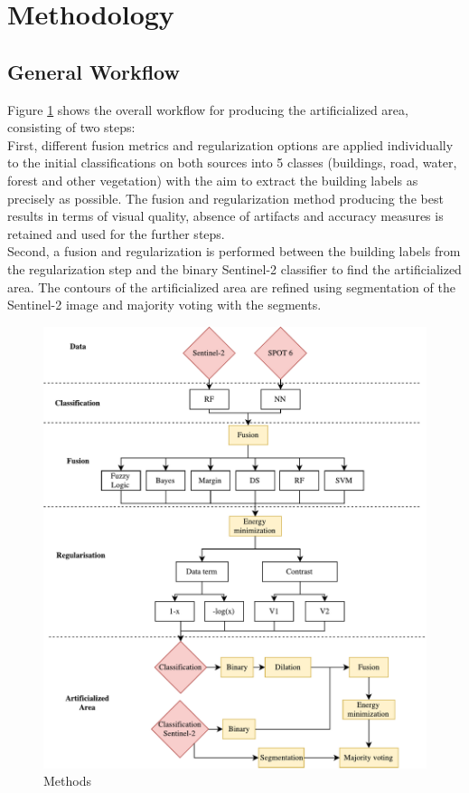 \documentclass[10pt]{article}
\begin{document}
\section{Methodology}\label{sec:method}
\subsection{General Workflow}
Figure \ref{fig:methods} shows the overall workflow for producing the artificialized area, consisting of two steps:\\

First, different fusion metrics and regularization options are applied individually to the initial classifications on both sources into 5 classes (buildings, road, water, forest and other vegetation) with the aim to extract the building labels as precisely as possible. The fusion and regularization method producing the best results in terms of visual quality, absence of artifacts and accuracy measures is retained and used for the further steps.\\

Second, a fusion and regularization is performed between the building labels from the regularization step and the binary Sentinel-2 classifier to find the artificialized area. The contours of the artificialized area are refined using segmentation of the Sentinel-2 image and majority voting with the segments.

\begin{figure}[H]
    \centering
    \includegraphics[width=.7\textwidth]{IGN-methods}
    \caption{Methods}
    \label{fig:methods}
\end{figure}
\end{document}
